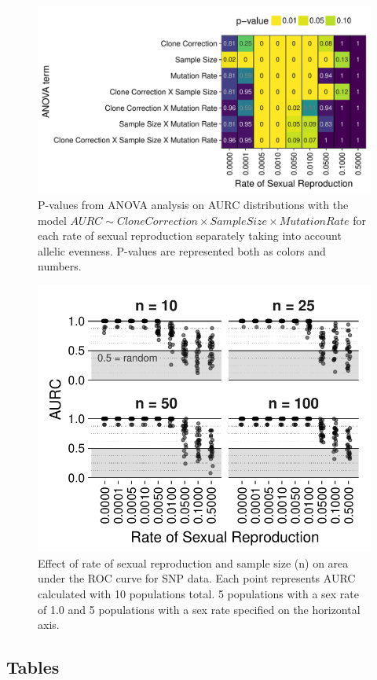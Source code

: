 \documentclass[]{article}
\theoremstyle{definition}
\theoremstyle{definition}
\theoremstyle{definition}
\theoremstyle{remark}
\begin{document}
\begin{figure}
\centering
\includegraphics[width=1.00000\textwidth]{figure/AURC_ANOVA_ea.pdf}
\caption{P-values from ANOVA analysis on AURC distributions with the
model
\(AURC \sim Clone Correction \times Sample Size \times Mutation Rate\)
for each rate of sexual reproduction separately taking into account
allelic evenness. P-values are represented both as colors and
numbers.}\label{fig:sim3a}
\end{figure}

\begin{figure}
\centering
\includegraphics[height=0.50000\textwidth]{figure/AURC_genomic.pdf}
\caption{Effect of rate of sexual reproduction and sample size (n) on
area under the ROC curve for SNP data. Each point represents AURC
calculated with 10 populations total. 5 populations with a sex rate of
1.0 and 5 populations with a sex rate specified on the horizontal
axis.}\label{fig:sim7}
\end{figure}

\newpage

\subsection{Tables}\label{tables}
\end{document}
